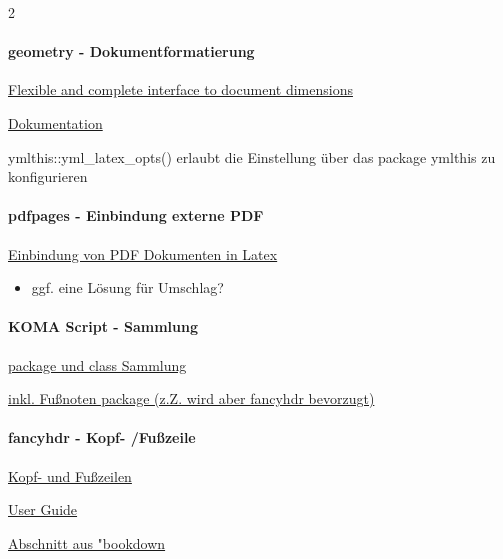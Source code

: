 \documentclass[
  a4paper,
  twoside]{article}
\providecommand{\tightlist}{%
  \setlength{\itemsep}{0pt}\setlength{\parskip}{0pt}}
\let\oldparagraph\paragraph
\renewcommand{\paragraph}[1]{\oldparagraph{#1}\mbox{}}
\begin{document}
\begin {multicols}{2}
\hypertarget{geometry---dokumentformatierung}{%
\paragraph{geometry - Dokumentformatierung}\label{geometry---dokumentformatierung}}

\href{https://ctan.org/pkg/geometry?lang=en}{Flexible and complete interface to document dimensions}

\href{http://mirrors.ctan.org/macros/latex/contrib/geometry/geometry-de.pdf}{Dokumentation}

ymlthis::yml\_latex\_opts() erlaubt die Einstellung über das package ymlthis zu konfigurieren

\hypertarget{pdfpages---einbindung-externe-pdf}{%
\paragraph{pdfpages - Einbindung externe PDF}\label{pdfpages---einbindung-externe-pdf}}

\href{https://ctan.org/pkg/pdfpages}{Einbindung von PDF Dokumenten in Latex}

\begin{itemize}
\tightlist
\item
  ggf. eine Lösung für Umschlag?
\end{itemize}

\hypertarget{koma-script---sammlung}{%
\paragraph{KOMA Script - Sammlung}\label{koma-script---sammlung}}

\href{https://www.ctan.org/pkg/koma-script}{package und class Sammlung}

\href{https://ctan.org/pkg/scrlayer-scrpage?lang=de}{inkl. Fußnoten package (z.Z. wird aber fancyhdr bevorzugt)}

\hypertarget{fancyhdr---kopf--fuuxdfzeile}{%
\paragraph{fancyhdr - Kopf- /Fußzeile}\label{fancyhdr---kopf--fuuxdfzeile}}

\href{https://ctan.org/pkg/fancyhdr?lang=de}{Kopf- und Fußzeilen}

\href{http://tug.ctan.org/tex-archive/macros/latex/contrib/fancyhdr/fancyhdr.pdf}{User Guide}

\href{https://bookdown.org/yihui/rmarkdown-cookbook/latex-header.html}{Abschnitt aus "bookdown}


\end{multicols}
\end{document}
